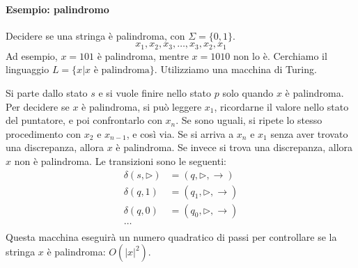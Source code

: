 \paragraph{Esempio: palindromo} Decidere se una stringa è palindroma, con $\Sigma = \{0,1\}$.
$$
    x_1,x_2,x_3,\dots,x_3,x_2,x_1
$$
Ad esempio, $x=101$ è palindroma, mentre $x=1010$ non lo è. Cerchiamo il linguaggio $L=\{x|x \text{ è palindroma}\}$. Utilizziamo una macchina di Turing.
\begin{center}
\end{center}
Si parte dallo stato $s$ e si vuole finire nello stato $p$ solo quando $x$ è palindroma. Per decidere se $x$ è palindroma, si può leggere $x_1$, ricordarne il valore nello stato del puntatore, e poi confrontarlo con $x_n$. Se sono uguali, si ripete lo stesso procedimento con $x_2$ e $x_{n-1}$, e così via. Se si arriva a $x_n$ e $x_1$ senza aver trovato una discrepanza, allora $x$ è palindroma. Se invece si trova una discrepanza, allora $x$ non è palindroma. Le transizioni sono le seguenti:
\begin{align*}
    \delta(s,\rhd) &= (q,\rhd,\to)\\
    \delta(q,1) &= (q_1,\rhd,\to)\\
    \delta(q,0) &= (q_0,\rhd,\to)\\
    \dots & \\
\end{align*}
Questa macchina eseguirà un numero quadratico di passi per controllare se la stringa $x$ è palindroma: $O(|x|^2)$.\medskip

